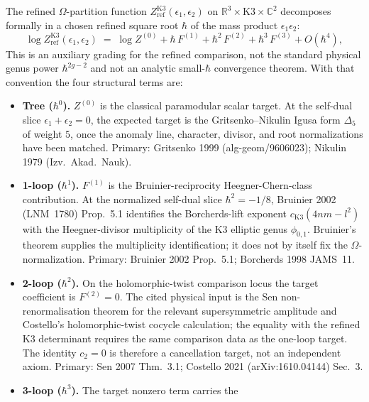 \begin{remark}
\label{rem:feyn-W16-loop-structure}
The refined $\Omega$-partition function
$Z_{\mathrm{ref}}^{\mathrm{K3}}(\epsilon_1, \epsilon_2)$ on
$\mathbb R^3 \times \mathrm{K3} \times \mathbb C^2$ decomposes
formally in a chosen refined square root $\hbar$ of the mass product
$\epsilon_1\epsilon_2$:
\begin{equation}
\label{eq:feyn-W16-loop-decomposition}
\log Z_{\mathrm{ref}}^{\mathrm{K3}}(\epsilon_1, \epsilon_2)
 \;=\; \log Z^{(0)} + \hbar\, F^{(1)} + \hbar^2\, F^{(2)}
 + \hbar^3\, F^{(3)} + O(\hbar^4),
\end{equation}
This is an auxiliary grading for the refined comparison, not the
standard physical genus power $\hbar^{2g-2}$ and not an analytic
small-$\hbar$ convergence theorem.  With that convention the four
structural terms are:
\begin{itemize}
\item \textbf{Tree ($\hbar^0$).} $Z^{(0)}$ is the classical paramodular
 scalar target. At the self-dual slice $\epsilon_1 + \epsilon_2
 = 0$, the expected target is the Gritsenko--Nikulin Igusa form
 $\Delta_5$ of weight $5$, once the anomaly line, character, divisor,
 and root normalizations have been matched. Primary: Gritsenko
 1999 (alg-geom/9606023); Nikulin 1979 (Izv.~Akad.~Nauk).
\item \textbf{1-loop ($\hbar^1$).} $F^{(1)}$ is the Bruinier-reciprocity
 Heegner-Chern-class contribution. At the normalized self-dual slice
 $\hbar^2=-1/8$, Bruinier 2002 (LNM~1780) Prop.~5.1 identifies the
 Borcherds-lift exponent $c_{\mathrm K3}(4nm-l^2)$ with the
 Heegner-divisor multiplicity of the K3 elliptic genus
 $\phi_{0,1}$.  Bruinier's theorem supplies the multiplicity
 identification; it does not by itself fix the $\Omega$-normalization.
 Primary: Bruinier 2002 Prop.~5.1; Borcherds 1998 JAMS~11.
\item \textbf{2-loop ($\hbar^2$).} On the holomorphic-twist comparison
 locus the target coefficient is $F^{(2)}=0$.  The cited physical input
 is the Sen non-renormalisation theorem for the relevant supersymmetric
 amplitude and Costello's holomorphic-twist cocycle calculation; the
 equality with the refined K3 determinant requires the same comparison
 data as the one-loop target.  The identity $c_2 = 0$ is therefore a
 cancellation target, not an independent axiom. Primary: Sen 2007
 Thm.~3.1; Costello 2021 (arXiv:1610.04144) Sec.~3.
\item \textbf{3-loop ($\hbar^3$).} The target nonzero term carries the

\end{itemize}
\end{remark}
